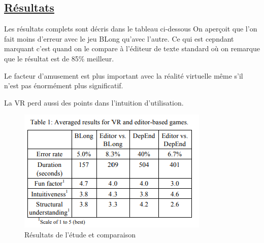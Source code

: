\documentclass[a4paper,10pt, oneside]{article}
\newcommand{\li}{\newline}
\begin{document}
\subsection{\ul{Résultats}}
    \par Les résultats complets sont décris dans le tableau ci-dessous On aperçoit que l'on fait moins d'erreur avec le jeu BLong qu'avec l'autre. Ce qui est cepndant marquant c'est quand on le compare à l'éditeur de texte standard où on remarque que le résultat est de 85\% meilleur.\li
    \par Le facteur d'amusement est plus important avec la réalité virtuelle même s'il n'est pas énormément plus significatif.\li
    \par La VR perd aussi des points dans l'intuition d'utilisation.
    \begin{figure}[!h]
        \centering
        \includegraphics{1}
        \caption{Résultats de l'étude et comparaison}
    \end{figure}

\newpage

 
\end{document}
